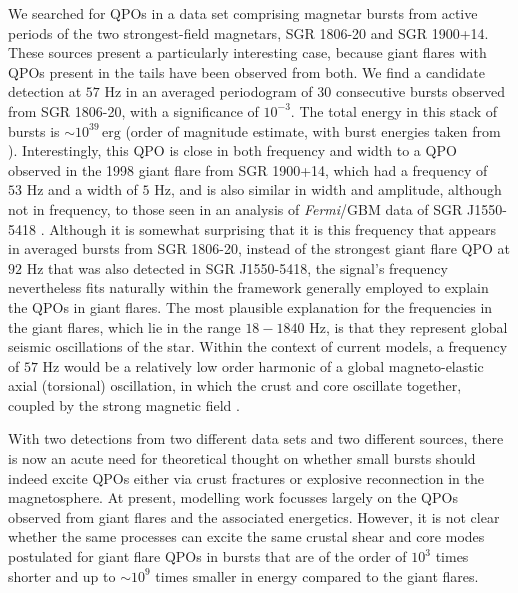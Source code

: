 \documentclass[numberedappendix]{emulateapj}
\newcommand{\hz}{\,\mathrm{Hz}}
\newcommand{\project}[1]{\textsl{#1}}
\newcommand{\fermi}{\project{Fermi}}
\begin{document}
We searched for QPOs in a data set comprising magnetar bursts from active periods of the two strongest-field magnetars, SGR 1806-20 and SGR 1900+14. These sources present a particularly interesting case, because giant flares with QPOs present in the tails have been observed from both.
We find a candidate detection at $57 \,\hz$ in an averaged periodogram of 30 consecutive bursts observed from SGR 1806-20, with a significance of $10^{-3}$. The total energy in this stack of bursts is $\sim 10^{39} \, \mathrm{erg}$ (order of magnitude estimate, with burst energies taken from \citealt{gogus2000}). Interestingly, this QPO is close in both frequency and width to a QPO observed in the 1998 giant flare from SGR 1900+14, which had a frequency of $53\,\hz$ and a width of $5\,\hz$, and is also similar in width and amplitude, although not in frequency, to those seen in an analysis of \fermi/GBM data of SGR J1550-5418 \citep{huppenkothen2014}. Although it is somewhat surprising that it is this frequency that appears in averaged bursts from SGR 1806-20, instead of the strongest giant flare QPO at $92\,\hz$ that was also detected in SGR J1550-5418, the signal's frequency nevertheless fits naturally within the framework generally employed to explain the QPOs in giant flares. The most plausible explanation for the frequencies in the giant flares, which lie in the range $18 - 1840 \, \hz$, is that they represent global seismic oscillations of the star.   Within the context of current models, a frequency of $57 \,\hz$ would be a relatively low order harmonic of a global magneto-elastic axial (torsional) oscillation, in which the crust and core oscillate together, coupled by the strong magnetic field \citep{glampedakis2006,andersson2009,steiner2009,vanhoven2011,vanhoven2012,colaiuda2011,colaiuda2012,gabler2012,gabler2013,passamonti2013b,passamonti2014,glampedakis2014}.


With two detections from two different data sets and two different sources, there is now an acute need for theoretical thought on whether small bursts should indeed excite QPOs either via crust fractures or explosive reconnection in the magnetosphere. At present, modelling work focusses largely on the QPOs observed from giant flares and the associated energetics. However, it is not clear whether the same processes can excite the same crustal shear and core modes postulated for giant flare QPOs in bursts that are of the order of $10^3$ times shorter and up to $\sim 10^{9}$ times smaller in energy compared to the giant flares.
\end{document}
